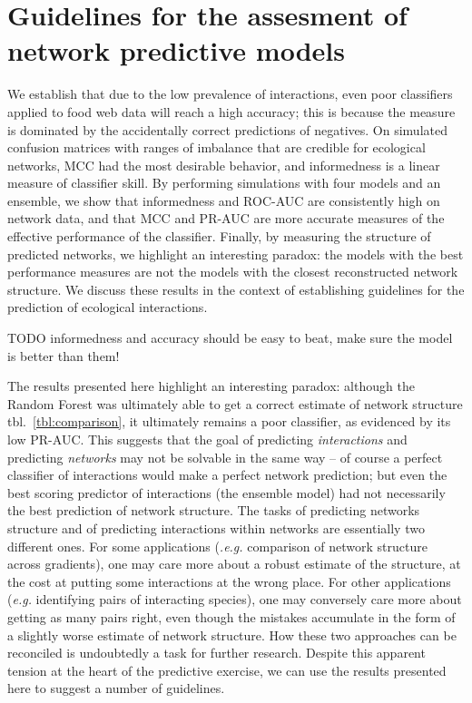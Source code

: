 \documentclass[11pt]{article}
\begin{document}
\hypertarget{guidelines-for-the-assesment-of-network-predictive-models}{%
\section{Guidelines for the assesment of network predictive
models}\label{guidelines-for-the-assesment-of-network-predictive-models}}

We establish that due to the low prevalence of interactions, even poor
classifiers applied to food web data will reach a high accuracy; this is
because the measure is dominated by the accidentally correct predictions
of negatives. On simulated confusion matrices with ranges of imbalance
that are credible for ecological networks, MCC had the most desirable
behavior, and informedness is a linear measure of classifier skill. By
performing simulations with four models and an ensemble, we show that
informedness and ROC-AUC are consistently high on network data, and that
MCC and PR-AUC are more accurate measures of the effective performance
of the classifier. Finally, by measuring the structure of predicted
networks, we highlight an interesting paradox: the models with the best
performance measures are not the models with the closest reconstructed
network structure. We discuss these results in the context of
establishing guidelines for the prediction of ecological interactions.

TODO informedness and accuracy should be easy to beat, make sure the
model is better than them!

The results presented here highlight an interesting paradox: although
the Random Forest was ultimately able to get a correct estimate of
network structure tbl.~\ref{tbl:comparison}, it ultimately remains a
poor classifier, as evidenced by its low PR-AUC. This suggests that the
goal of predicting \emph{interactions} and predicting \emph{networks}
may not be solvable in the same way -- of course a perfect classifier of
interactions would make a perfect network prediction; but even the best
scoring predictor of interactions (the ensemble model) had not
necessarily the best prediction of network structure. The tasks of
predicting networks structure and of predicting interactions within
networks are essentially two different ones. For some applications
(\emph{.e.g.} comparison of network structure across gradients), one may
care more about a robust estimate of the structure, at the cost at
putting some interactions at the wrong place. For other applications
(\emph{e.g.} identifying pairs of interacting species), one may
conversely care more about getting as many pairs right, even though the
mistakes accumulate in the form of a slightly worse estimate of network
structure. How these two approaches can be reconciled is undoubtedly a
task for further research. Despite this apparent tension at the heart of
the predictive exercise, we can use the results presented here to
suggest a number of guidelines.
\end{document}
